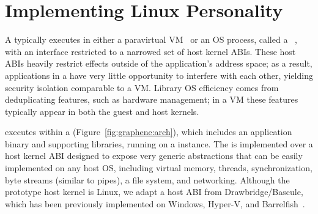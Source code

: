 \section{Implementing Linux Personality}
\label{sec:graphene:background}

A \libos{} typically executes in either a paravirtual VM~\citep{unikernels,osv}
or an OS process, called a \term{\picoproc{}}~\citep{porter11drawbridge,baumann13bascule},
with an interface restricted to a narrowed set of host kernel ABIs.
These host ABIs heavily restrict effects outside of the application's address space;
as a result, applications in a \picoproc{} have very little opportunity to interfere with each other,
yielding security isolation comparable to a VM.
Library OS efficiency comes from deduplicating features, such as hardware management;
in a VM these features typically appear in both the guest and host kernels.


\sysname{} executes within a \picoproc{} (Figure~\ref{fig:graphene:arch}),
which includes an  application binary and supporting libraries, 
running on a \libos{} instance.
The \libos{} is implemented over a host kernel ABI
designed to expose very generic abstractions that can be easily 
implemented on any host OS, including virtual memory, threads, synchronization, byte streams (similar to pipes),
a file system, and networking.
Although the \sysname{} prototype  host kernel is Linux, 
we adapt a host ABI from Drawbridge/Bascule,
which has been previously implemented on Windows, Hyper-V, and Barrelfish~\citep{porter11drawbridge,baumann13bascule,baumann09barrelfish}.


